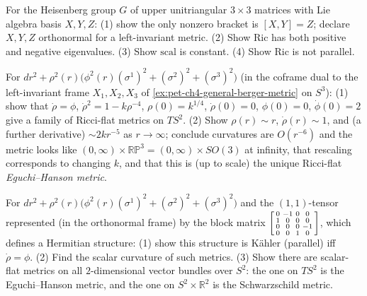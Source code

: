 \begin{remark}
  \label{rem:pet-ch4-ex-22}
  For the Heisenberg group $G$ of upper unitriangular $3\times3$ matrices with
  Lie algebra basis $X,Y,Z$: (1) show the only nonzero bracket is $[X,Y]=Z$;
  declare $X,Y,Z$ orthonormal for a left-invariant metric. (2) Show
  $\mathrm{Ric}$ has both positive and negative eigenvalues. (3) Show
  $\mathrm{scal}$ is constant. (4) Show $\mathrm{Ric}$ is not parallel.
\end{remark}

\begin{remark}
  \label{rem:pet-ch4-ex-23}
  For $dr^2+\rho^2(r)\big(\phi^2(r)(\sigma^1)^2+(\sigma^2)^2+(\sigma^3)^2\big)$
  (in the coframe dual to the left-invariant frame $X_1,X_2,X_3$ of
  \cref{ex:pet-ch4-general-berger-metric} on $S^3$):
  (1) show that $\dot\rho=\phi$, $\dot\rho^2=1-k\rho^{-4}$,
  $\rho(0)=k^{1/4}$, $\dot\rho(0)=0$, $\phi(0)=0$, $\dot\phi(0)=2$ give a family
  of Ricci-flat metrics on $TS^2$. (2) Show $\rho(r)\sim r$, $\dot\rho(r)\sim1$,
  and (a further derivative) $\sim2kr^{-5}$ as $r\to\infty$; conclude
  curvatures are $O(r^{-6})$ and the metric looks like
  $(0,\infty)\times\mathbb{RP}^3=(0,\infty)\times SO(3)$ at infinity, that
  rescaling corresponds to changing $k$, and that this is (up to scale) the
  unique Ricci-flat \emph{Eguchi--Hanson metric}.
\end{remark}

\begin{remark}
  \label{rem:pet-ch4-ex-24}
  For $dr^2+\rho^2(r)\big(\phi^2(r)(\sigma^1)^2+(\sigma^2)^2+(\sigma^3)^2\big)$
  and the $(1,1)$-tensor represented (in the orthonormal frame) by the block
  matrix $\begin{bsmallmatrix}0&-1&0&0\\1&0&0&0\\0&0&0&-1\\0&0&1&0\end{bsmallmatrix}$,
  which defines a Hermitian structure: (1) show this structure is Kähler
  (parallel) iff $\dot\rho=\phi$. (2) Find the scalar curvature of such
  metrics. (3) Show there are scalar-flat metrics on all $2$-dimensional
  vector bundles over $S^2$: the one on $TS^2$ is the Eguchi--Hanson metric,
  and the one on $S^2\times\mathbb{R}^2$ is the Schwarzschild metric.
\end{remark}

